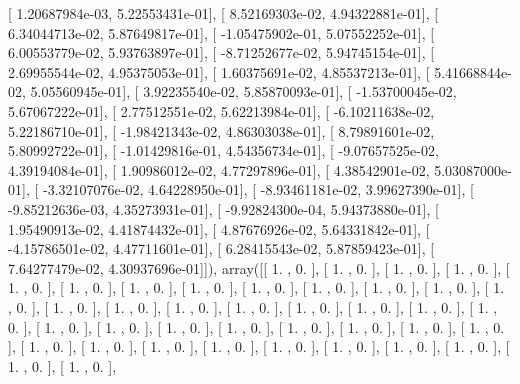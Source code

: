 \documentclass{article}
\begin{document}
       [  1.20687984e-03,   5.22553431e-01],
       [  8.52169303e-02,   4.94322881e-01],
       [  6.34044713e-02,   5.87649817e-01],
       [ -1.05475902e-01,   5.07552252e-01],
       [  6.00553779e-02,   5.93763897e-01],
       [ -8.71252677e-02,   5.94745154e-01],
       [  2.69955544e-02,   4.95375053e-01],
       [  1.60375691e-02,   4.85537213e-01],
       [  5.41668844e-02,   5.05560945e-01],
       [  3.92235540e-02,   5.85870093e-01],
       [ -1.53700045e-02,   5.67067222e-01],
       [  2.77512551e-02,   5.62213984e-01],
       [ -6.10211638e-02,   5.22186710e-01],
       [ -1.98421343e-02,   4.86303038e-01],
       [  8.79891601e-02,   5.80992722e-01],
       [ -1.01429816e-01,   4.54356734e-01],
       [ -9.07657525e-02,   4.39194084e-01],
       [  1.90986012e-02,   4.77297896e-01],
       [  4.38542901e-02,   5.03087000e-01],
       [ -3.32107076e-02,   4.64228950e-01],
       [ -8.93461181e-02,   3.99627390e-01],
       [ -9.85212636e-03,   4.35273931e-01],
       [ -9.92824300e-04,   5.94373880e-01],
       [  1.95490913e-02,   4.41874432e-01],
       [  4.87676926e-02,   5.64331842e-01],
       [ -4.15786501e-02,   4.47711601e-01],
       [  6.28415543e-02,   5.87859423e-01],
       [  7.64277479e-02,   4.30937696e-01]]), array([[ 1.        ,  0.        ],
       [ 1.        ,  0.        ],
       [ 1.        ,  0.        ],
       [ 1.        ,  0.        ],
       [ 1.        ,  0.        ],
       [ 1.        ,  0.        ],
       [ 1.        ,  0.        ],
       [ 1.        ,  0.        ],
       [ 1.        ,  0.        ],
       [ 1.        ,  0.        ],
       [ 1.        ,  0.        ],
       [ 1.        ,  0.        ],
       [ 1.        ,  0.        ],
       [ 1.        ,  0.        ],
       [ 1.        ,  0.        ],
       [ 1.        ,  0.        ],
       [ 1.        ,  0.        ],
       [ 1.        ,  0.        ],
       [ 1.        ,  0.        ],
       [ 1.        ,  0.        ],
       [ 1.        ,  0.        ],
       [ 1.        ,  0.        ],
       [ 1.        ,  0.        ],
       [ 1.        ,  0.        ],
       [ 1.        ,  0.        ],
       [ 1.        ,  0.        ],
       [ 1.        ,  0.        ],
       [ 1.        ,  0.        ],
       [ 1.        ,  0.        ],
       [ 1.        ,  0.        ],
       [ 1.        ,  0.        ],
       [ 1.        ,  0.        ],
       [ 1.        ,  0.        ],
       [ 1.        ,  0.        ],
       [ 1.        ,  0.        ],
       [ 1.        ,  0.        ],
       [ 1.        ,  0.        ],
       [ 1.        ,  0.        ],
       [ 1.        ,  0.        ],
\end{document}
